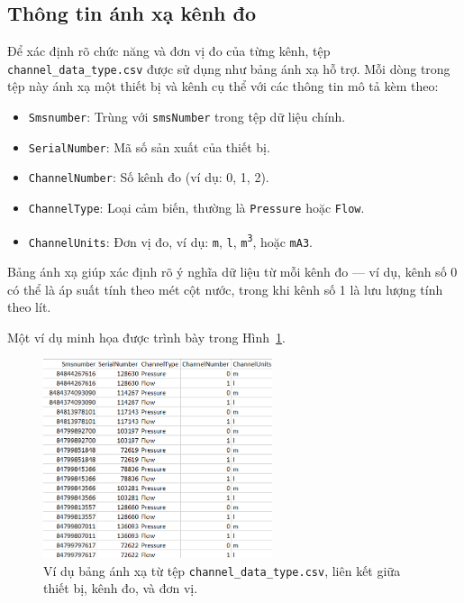 \subsection{Thông tin ánh xạ kênh đo}

Để xác định rõ chức năng và đơn vị đo của từng kênh, tệp \texttt{channel\_data\_type.csv} được sử dụng như bảng ánh xạ hỗ trợ. Mỗi dòng trong tệp này ánh xạ một thiết bị và kênh cụ thể với các thông tin mô tả kèm theo:

\begin{itemize}
    \item \texttt{Smsnumber}: Trùng với \texttt{smsNumber} trong tệp dữ liệu chính.
    \item \texttt{SerialNumber}: Mã số sản xuất của thiết bị.
    \item \texttt{ChannelNumber}: Số kênh đo (ví dụ: 0, 1, 2).
    \item \texttt{ChannelType}: Loại cảm biến, thường là \texttt{Pressure} hoặc \texttt{Flow}.
    \item \texttt{ChannelUnits}: Đơn vị đo, ví dụ: \texttt{m}, \texttt{l}, \texttt{m\textsuperscript{3}}, hoặc \texttt{mA3}.
\end{itemize}

\noindent
Bảng ánh xạ giúp xác định rõ ý nghĩa dữ liệu từ mỗi kênh đo — ví dụ, kênh số 0 có thể là áp suất tính theo mét cột nước, trong khi kênh số 1 là lưu lượng tính theo lít.

\vspace{0.5em}
Một ví dụ minh họa được trình bày trong Hình~\ref{fig:channel_mapping_table}.

\begin{figure}[H]
    \centering
    \includegraphics[width=0.6\textwidth]{image/section6_1/channel_mapping_table.png}
    \caption{Ví dụ bảng ánh xạ từ tệp \texttt{channel\_data\_type.csv}, liên kết giữa thiết bị, kênh đo, và đơn vị.}
    \label{fig:channel_mapping_table}
\end{figure}

